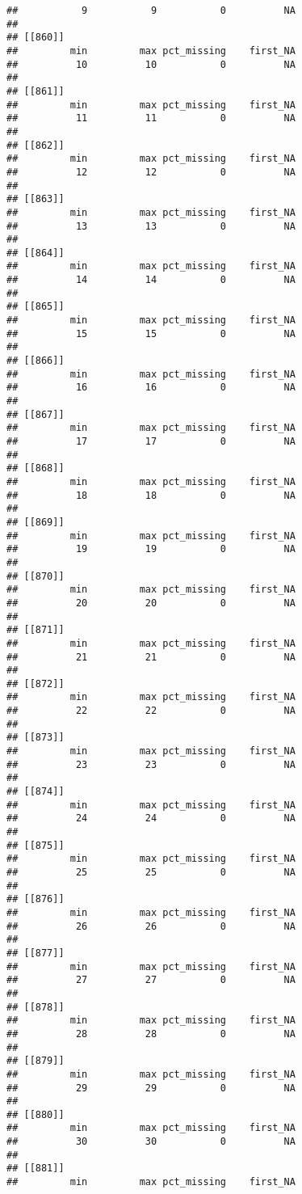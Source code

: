 \documentclass[
]{article}
\begin{document}
\begin{verbatim}
##           9           9           0          NA 
## 
## [[860]]
##         min         max pct_missing    first_NA 
##          10          10           0          NA 
## 
## [[861]]
##         min         max pct_missing    first_NA 
##          11          11           0          NA 
## 
## [[862]]
##         min         max pct_missing    first_NA 
##          12          12           0          NA 
## 
## [[863]]
##         min         max pct_missing    first_NA 
##          13          13           0          NA 
## 
## [[864]]
##         min         max pct_missing    first_NA 
##          14          14           0          NA 
## 
## [[865]]
##         min         max pct_missing    first_NA 
##          15          15           0          NA 
## 
## [[866]]
##         min         max pct_missing    first_NA 
##          16          16           0          NA 
## 
## [[867]]
##         min         max pct_missing    first_NA 
##          17          17           0          NA 
## 
## [[868]]
##         min         max pct_missing    first_NA 
##          18          18           0          NA 
## 
## [[869]]
##         min         max pct_missing    first_NA 
##          19          19           0          NA 
## 
## [[870]]
##         min         max pct_missing    first_NA 
##          20          20           0          NA 
## 
## [[871]]
##         min         max pct_missing    first_NA 
##          21          21           0          NA 
## 
## [[872]]
##         min         max pct_missing    first_NA 
##          22          22           0          NA 
## 
## [[873]]
##         min         max pct_missing    first_NA 
##          23          23           0          NA 
## 
## [[874]]
##         min         max pct_missing    first_NA 
##          24          24           0          NA 
## 
## [[875]]
##         min         max pct_missing    first_NA 
##          25          25           0          NA 
## 
## [[876]]
##         min         max pct_missing    first_NA 
##          26          26           0          NA 
## 
## [[877]]
##         min         max pct_missing    first_NA 
##          27          27           0          NA 
## 
## [[878]]
##         min         max pct_missing    first_NA 
##          28          28           0          NA 
## 
## [[879]]
##         min         max pct_missing    first_NA 
##          29          29           0          NA 
## 
## [[880]]
##         min         max pct_missing    first_NA 
##          30          30           0          NA 
## 
## [[881]]
##         min         max pct_missing    first_NA 

\end{verbatim}
\end{document}
